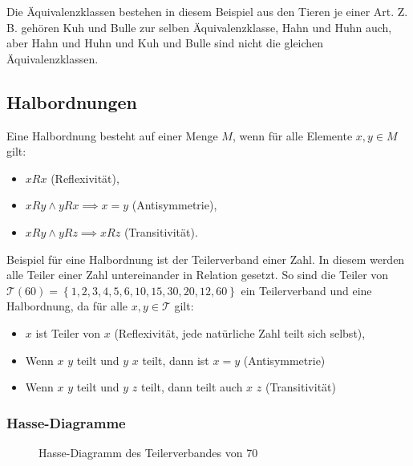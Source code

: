 \documentclass{scrartcl}
\begin{document}
Die Äquivalenzklassen bestehen in diesem Beispiel aus den Tieren je einer Art.
Z.\,B. gehören Kuh und Bulle zur selben Äquivalenzklasse, Hahn und Huhn auch, aber
Hahn und Huhn und Kuh und Bulle sind nicht die gleichen Äquivalenzklassen.

\subsection{Halbordnungen}

Eine Halbordnung besteht auf einer Menge $M$, wenn für alle Elemente $x, y \in M$
gilt:

\begin{itemize}
	\item $xRx$ (Reflexivität),
	\item $xRy \wedge yRx \implies x = y$ (Antisymmetrie),
	\item $xRy \wedge yRz \implies xRz$ (Transitivität).
\end{itemize}

Beispiel für eine Halbordnung ist der Teilerverband einer Zahl. In diesem
werden alle Teiler einer Zahl untereinander in Relation gesetzt. So sind
die Teiler von 
$\mathcal{T}(60) = \left\{1, 2, 3, 4, 5, 6, 10, 15, 30, 20, 12, 60\right\}$ 
ein Teilerverband und eine Halbordnung, da für alle $x, y \in \mathcal{T}$ gilt:

\begin{itemize}
	\item $x$ ist Teiler von $x$ (Reflexivität, jede natürliche Zahl teilt sich
		selbst),
	\item Wenn $x$ $y$ teilt und $y$ $x$ teilt, dann ist $x = y$ (Antisymmetrie)
	\item Wenn $x$ $y$ teilt und $y$ $z$ teilt, dann teilt auch 
		$x$ $z$ (Transitivität)
\end{itemize}

\subsubsection{Hasse-Diagramme}


\begin{figure}
	\centering
	\caption{Hasse-Diagramm des Teilerverbandes von 70}
	\label{hasse}
\end{figure}
\end{document}
